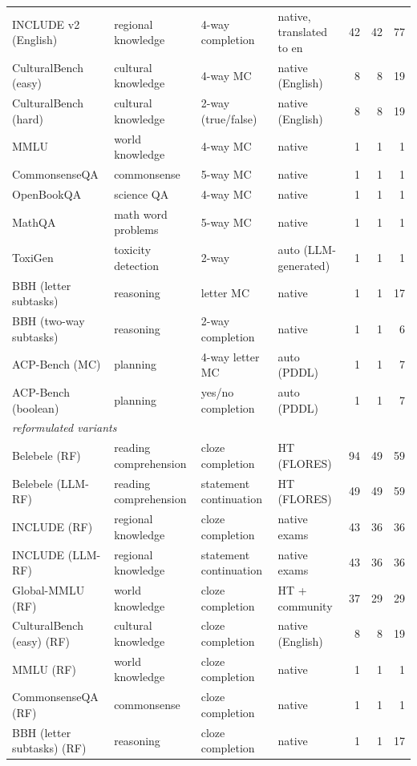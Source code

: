 \begin{table}[t]
{\begin{tabular}{llllrrr}
INCLUDE v2 (English) & regional knowledge & 4-way completion & native, translated to en & 42 & 42 & 77 \\
CulturalBench (easy) & cultural knowledge & 4-way MC & native (English) & 8 & 8 & 19 \\
CulturalBench (hard) & cultural knowledge & 2-way (true/false) & native (English) & 8 & 8 & 19 \\
MMLU & world knowledge & 4-way MC & native & 1 & 1 & 1 \\
CommonsenseQA & commonsense & 5-way MC & native & 1 & 1 & 1 \\
OpenBookQA & science QA & 4-way MC & native & 1 & 1 & 1 \\
MathQA & math word problems & 5-way MC & native & 1 & 1 & 1 \\
ToxiGen & toxicity detection & 2-way & auto (LLM-generated) & 1 & 1 & 1 \\
BBH (letter subtasks) & reasoning & letter MC & native & 1 & 1 & 17 \\
BBH (two-way subtasks) & reasoning & 2-way completion & native & 1 & 1 & 6 \\
ACP-Bench (MC) & planning & 4-way letter MC & auto (PDDL) & 1 & 1 & 7 \\
ACP-Bench (boolean) & planning & yes/no completion & auto (PDDL) & 1 & 1 & 7 \\
\midrule
\multicolumn{7}{l}{\textit{reformulated variants}} \\
Belebele (RF) & reading comprehension & cloze completion & HT (FLORES) & 94 & 49 & 59 \\
Belebele (LLM-RF) & reading comprehension & statement continuation & HT (FLORES) & 49 & 49 & 59 \\
INCLUDE (RF) & regional knowledge & cloze completion & native exams & 43 & 36 & 36 \\
INCLUDE (LLM-RF) & regional knowledge & statement continuation & native exams & 43 & 36 & 36 \\
Global-MMLU (RF) & world knowledge & cloze completion & HT + community & 37 & 29 & 29 \\
CulturalBench (easy) (RF) & cultural knowledge & cloze completion & native (English) & 8 & 8 & 19 \\
MMLU (RF) & world knowledge & cloze completion & native & 1 & 1 & 1 \\
CommonsenseQA (RF) & commonsense & cloze completion & native & 1 & 1 & 1 \\
BBH (letter subtasks) (RF) & reasoning & cloze completion & native & 1 & 1 & 17 \\

\end{tabular}}
\end{table}

